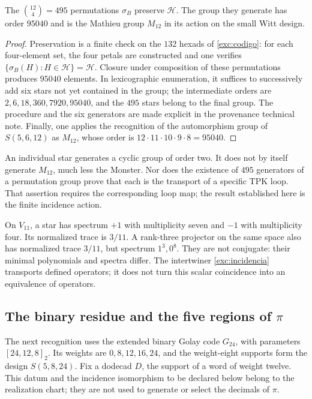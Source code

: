 \begin{proposition}
\label{exc:m12}
The $\binom{12}4=495$ permutations $\sigma_B$ preserve $\mathcal H$.
The group they generate has order $95040$ and is the Mathieu group
$M_{12}$ in its action on the small Witt design.
\end{proposition}

\begin{proof}
Preservation is a finite check on the
$132$ hexads of \eqref{exc:codigo}: for each four-element set, the
four petals are constructed and one verifies
$\{\sigma_B(H):H\in\mathcal H\}=\mathcal H$.
Closure under composition of these permutations produces $95040$
elements. In lexicographic enumeration, it suffices to successively add
six stars not yet contained in the group; the intermediate orders
are $2,6,18,360,7920,95040$, and the $495$ stars belong to the
final group. The procedure and the six generators are made explicit in
the provenance technical note. Finally, one applies the recognition
of the automorphism group of $S(5,6,12)$ as $M_{12}$, whose order is
$12\cdot11\cdot10\cdot9\cdot8=95040$.
\end{proof}

An individual star generates a cyclic group of order two. It does not
by itself generate $M_{12}$, much less the Monster. Nor does the
existence of $495$ generators of a permutation group prove that
each is the transport of a specific TPK loop. That assertion
requires the corresponding loop map; the result established here
is the finite incidence action.

\begin{remark}
On $V_{11}$, a star has spectrum $+1$ with multiplicity seven
and $-1$ with multiplicity four. Its normalized trace is $3/11$.
A rank-three projector on the same space also has normalized trace
$3/11$, but spectrum $1^3,0^8$. They are not conjugate: their
minimal polynomials and spectra differ. The intertwiner
\eqref{exc:incidencia} transports defined operators; it does not turn
this scalar coincidence into an equivalence of operators.
\end{remark}

\subsection{The binary residue and the five regions of \texorpdfstring{$\pi$}{pi}}
\label{exc:cinco-regiones}

The next recognition uses the extended binary Golay
code $G_{24}$, with parameters $[24,12,8]_2$. Its weights are
$0,8,12,16,24$, and the weight-eight supports form the design
$S(5,8,24)$. Fix a dodecad $D$, the support of a word of weight
twelve. This datum and the incidence isomorphism to be declared
below belong to the realization chart; they are not used to
generate or select the decimals of $\pi$.

